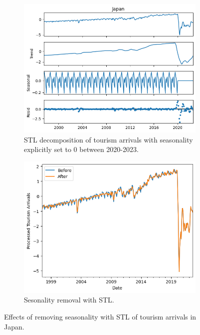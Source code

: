 \documentclass{article}
\begin{document}
\begin{figure}[htbp]
     \centering
     \begin{subfigure}[b]{0.45\textwidth}
         \centering
         \includegraphics[width=\textwidth]{images/stl.png}
         \caption{STL decomposition of tourism arrivals with seasonality explicitly set to 0 between 2020-2023.}
     \end{subfigure}
     \begin{subfigure}[b]{0.45\textwidth}
         \centering
         \includegraphics[width=\textwidth]{images/seasonality removal.png}
         \caption{Sesonality removal with STL.}
     \end{subfigure}
    \caption{Effects of removing seasonality with STL of tourism arrivals in Japan.}
    \label{fig:stl}
\end{figure}
\end{document}
